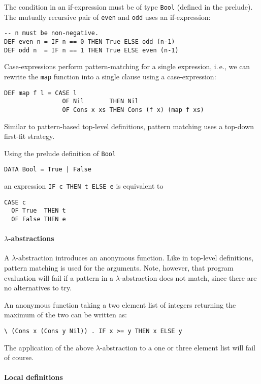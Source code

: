 \documentclass{article}
\begin{document}
The condition in an if-expression must be of type \verb|Bool| (defined
in the prelude). The mutually recursive pair of \verb|even| and
\verb|odd| uses an if-expression:
\begin{verbatim}
-- n must be non-negative.
DEF even n = IF n == 0 THEN True ELSE odd (n-1)
DEF odd n  = IF n == 1 THEN True ELSE even (n-1)
\end{verbatim}

Case-expressions perform pattern-matching for a single expression,
i.\,e., we can rewrite the \verb|map| function into a single clause
using a case-expression:
\begin{verbatim}
DEF map f l = CASE l
                OF Nil       THEN Nil
                OF Cons x xs THEN Cons (f x) (map f xs)
\end{verbatim}
Similar to pattern-based top-level definitions, pattern matching uses
a top-down first-fit strategy.

Using the prelude definition of \verb|Bool|
\begin{verbatim}
DATA Bool = True | False
\end{verbatim}
an expression \verb|IF c THEN t ELSE e| is equivalent to
\begin{verbatim}
CASE c
  OF True  THEN t 
  OF False THEN e
\end{verbatim}


\paragraph{$\lambda$-abstractions}
\label{sec:lambda-abstractions}

A $\lambda$-abstraction introduces an anonymous function. Like in
top-level definitions, pattern matching is used for the
arguments. Note, however, that program evaluation will fail if a
pattern in a $\lambda$-abstraction does not match, since there are no
alternatives to try.

An anonymous function taking a two element list of integers returning
the maximum of the two can be written as:
\begin{verbatim}
\ (Cons x (Cons y Nil)) . IF x >= y THEN x ELSE y
\end{verbatim}
The application of the above $\lambda$-abstraction to a one or three
element list will fail of course.


\paragraph{Local definitions}
\label{sec:local-definitions}
\end{document}
